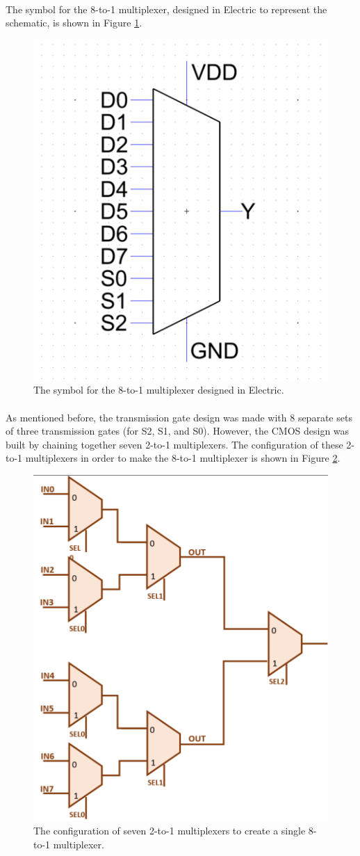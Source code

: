 \documentclass{article}
\begin{document}
  \paragraph{}
  The symbol for the 8-to-1 multiplexer, designed in Electric to represent the schematic, is shown in Figure \ref{fig:symbol}.


  \begin{figure}[H]
    \centering
    \includegraphics[width=0.5\linewidth, frame]{screenshots/symbol.png}
    \caption{The symbol for the 8-to-1 multiplexer designed in Electric.}
    \label{fig:symbol}
  \end{figure}



  \paragraph{}
  As mentioned before, the transmission gate design was made with 8 separate sets of three transmission gates (for S2, S1, and S0). However, the CMOS design was built by chaining together seven 2-to-1 multiplexers. The configuration of these 2-to-1 multiplexers in order to make the 8-to-1 multiplexer is shown in Figure \ref{fig:mux}.


  \begin{figure}[H]
    \centering
    \includegraphics[width=0.5\linewidth, frame]{images/mux.png}
    \caption{The configuration of seven 2-to-1 multiplexers to create a single 8-to-1 multiplexer.}
    \label{fig:mux}
  \end{figure}
\end{document}
